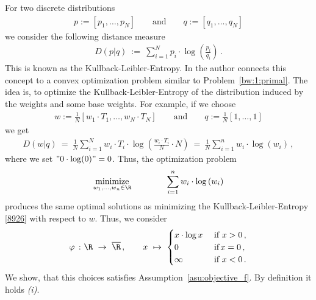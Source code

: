 \begin{example}
  For two discrete distributions
  \begin{gather*}
    p:=[p_1,\ldots,p_N]
    \qquad
    \text{and}
    \qquad
    q:=[q_1,\ldots,q_N]
  \end{gather*}
  we consider the following distance measure
  \begin{gather*}
   D(p|q)
   \ 
   :=
   \ 
   \sum_{i=1}^{N} 
   p_i
   \cdot
   \log
   \left( 
     \frac{p_i}{q_i}
   \right)
   \,.
  \end{gather*}
  This is known as the Kullback-Leibler-Entropy.
  In \cite[§3.1]{Hainmueller2012} the author connects this concept to a convex optimization problem similar to Problem~\ref{bw:1:primal}.
  The idea is, to optimize the Kullback-Leibler-Entropy of the distribution induced by the weights and some base weights.
  For example, if we choose
  \begin{gather*}
    w:=
    \frac{1}{N}[w_1\cdot T_1,\ldots,w_N\cdot T_N]
    \qquad
    \text{and}
    \qquad
    q:=\frac{1}{N}[1,\ldots,1]
  \end{gather*}
  we get
  \begin{align}
    \label{8926}
   D(w|q)
   \ 
   =
   \ 
   \frac{1}{N}
   \sum_{i=1}^{N} 
w_i\cdot T_i
   \cdot
   \log
   \left( 
     \frac{w_i\cdot T_i}{N}\cdot N
   \right)
   \ 
   =
   \ 
   \frac{1}{N}
   \sum_{i=1}^{n} 
w_i
   \cdot
   \log
   \left( 
     w_i
   \right)
   \,,
  \end{align}
  where we set $"0\cdot \log(0)"=0$. Thus, the optimization problem
  \begin{gather*}
    \underset{w_1, \ldots, w_n \in \R}
    {\text{minimize}}
    \qquad\qquad
    \sum_{i = 1}^{n} 
w_i
   \cdot
   \log
   \left( 
     w_i
   \right)
  \end{gather*}
  produces the same optimal solutions as minimizing the Kullback-Leibler-Entropy \eqref{8926} with respect to $w$.
Thus, we consider 
\begin{gather*}
  \varphi
  \ 
  \colon
  \R
  \ 
  \to
  \ 
  \overline{\R}
  \,,
  \qquad
  x
  \ 
  \mapsto
  \ 
  \begin{cases}
    x\cdot \log x\ &\text{if}\ x>0\,, \\
    0 \ &\text{if}\, x=0\,,\\
    \infty\ &\text{if}\ x<0\,.
  \end{cases}
\end{gather*}
We show, that this choices satisfies Assumption~\ref{asu:objective_f}.
By definition it holds \textit{(i)}.

\end{example}
